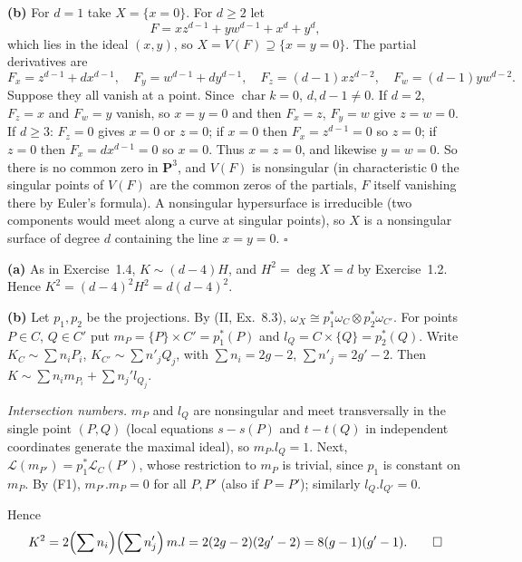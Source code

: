 \documentclass[11pt]{article}
\begin{document}
\textbf{(b)} For $d=1$ take $X=\{x=0\}$. For $d\ge2$ let
\[ F=x z^{d-1}+y w^{d-1}+x^d+y^d, \]
which lies in the ideal $(x,y)$, so $X=V(F)\supseteq\{x=y=0\}$. The partial derivatives are
\[ F_x=z^{d-1}+dx^{d-1},\quad F_y=w^{d-1}+dy^{d-1},\quad F_z=(d-1)xz^{d-2},\quad F_w=(d-1)yw^{d-2}. \]
Suppose they all vanish at a point. Since $\operatorname{char}k=0$, $d,d-1\neq0$. If $d=2$, $F_z=x$ and $F_w=y$ vanish, so $x=y=0$ and then $F_x=z$, $F_y=w$ give $z=w=0$. If $d\ge3$: $F_z=0$ gives $x=0$ or $z=0$; if $x=0$ then $F_x=z^{d-1}=0$ so $z=0$; if $z=0$ then $F_x=dx^{d-1}=0$ so $x=0$. Thus $x=z=0$, and likewise $y=w=0$. So there is no common zero in $\mathbf P^3$, and $V(F)$ is nonsingular (in characteristic $0$ the singular points of $V(F)$ are the common zeros of the partials, $F$ itself vanishing there by Euler's formula). A nonsingular hypersurface is irreducible (two components would meet along a curve at singular points), so $X$ is a nonsingular surface of degree $d$ containing the line $x=y=0$. \hfill$\square$

\pf
\textbf{(a)} As in Exercise~1.4, $K\sim(d-4)H$, and $H^2=\deg X=d$ by Exercise~1.2. Hence $K^2=(d-4)^2H^2=d(d-4)^2$.

\textbf{(b)} Let $p_1,p_2$ be the projections. By (II, Ex.~8.3), $\omega_X\cong p_1^*\omega_C\otimes p_2^*\omega_{C'}$. For points $P\in C$, $Q\in C'$ put $m_P=\{P\}\times C'=p_1^*(P)$ and $l_Q=C\times\{Q\}=p_2^*(Q)$. Write $K_C\sim\sum n_iP_i$, $K_{C'}\sim\sum n'_jQ_j$, with $\sum n_i=2g-2$, $\sum n'_j=2g'-2$. Then $K\sim\sum n_im_{P_i}+\sum n_j'l_{Q_j}$.

\emph{Intersection numbers.} $m_P$ and $l_Q$ are nonsingular and meet transversally in the single point $(P,Q)$ (local equations $s-s(P)$ and $t-t(Q)$ in independent coordinates generate the maximal ideal), so $m_P.l_Q=1$. Next, $\mathcal L(m_{P'})=p_1^*\mathcal L_C(P')$, whose restriction to $m_P$ is trivial, since $p_1$ is constant on $m_P$. By (F1), $m_{P'}.m_P=0$ for all $P,P'$ (also if $P=P'$); similarly $l_Q.l_{Q'}=0$.

Hence
\[ K^2=2\Bigl(\sum n_i\Bigr)\Bigl(\sum n'_j\Bigr)\,m.l=2(2g-2)(2g'-2)=8(g-1)(g'-1).\qquad\square \]
\end{document}
